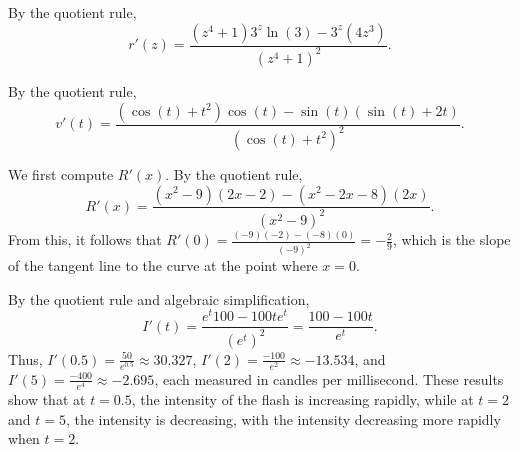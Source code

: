 \begin{activitySolution}
\ba
	\item By the quotient rule,
	$$r'(z)=\frac{(z^4+1) 3^z \ln(3) - 3^z(4z^3)}{(z^4 + 1)^2}.$$
	\item By the quotient rule, 
	$$v'(t) = \frac{(\cos(t) + t^2)\cos(t) - \sin(t)(\sin(t) + 2t)}{(\cos(t) + t^2)^2}.$$
	\item We first compute $R'(x)$.  By the quotient rule,
	$$R'(x) = \frac{(x^2 - 9)(2x - 2) - (x^2 - 2x - 8)(2x)}{(x^2 - 9)^2}.$$
	From this, it follows that $R'(0) = \frac{(-9)(-2)-(-8)(0)}{(-9)^2} = -\frac{2}{9}$, which is the slope of the tangent line to the curve at the point where $x = 0$.
	\item By the quotient rule and algebraic simplification,
$$I'(t) = \frac{e^t 100 - 100te^t}{(e^t)^2} = \frac{100-100t}{e^t}.$$
Thus, $I'(0.5) = \frac{50}{e^{0.5}} \approx 30.327$, $I'(2) = \frac{-100}{e^{2}} \approx -13.534$, and $I'(5) = \frac{-400}{e^4} \approx -2.695$, each measured in candles per millisecond.  These results show that at $t = 0.5$, the intensity of the flash is increasing rapidly, while at $t = 2$ and $t = 5$, the intensity is decreasing, with the intensity decreasing more rapidly when $t = 2$.
\ea
\end{activitySolution}
\aftera